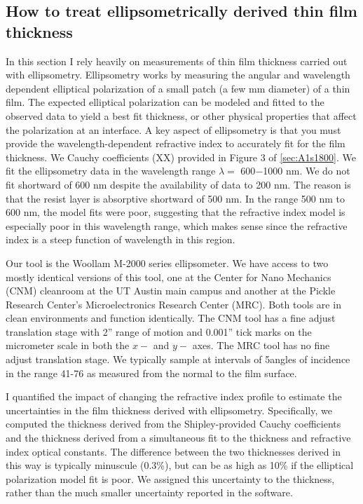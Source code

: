\subsection{How to treat ellipsometrically derived thin film thickness}
In this section I rely heavily on measurements of thin film thickness carried out with ellipsometry.  Ellipsometry works by measuring the angular and wavelength dependent elliptical polarization of a small patch (a few mm diameter) of a thin film.  The expected elliptical polarization can be modeled and fitted to the observed data to yield a best fit thickness, or other physical properties that affect the polarization at an interface.  A key aspect of ellipsometry is that you must provide the wavelength-dependent refractive index to accurately fit for the film thickness.  We Cauchy coefficients (XX) provided in Figure 3 of \ref{sec:A1s1800}.  We fit the ellipsometry data in the wavelength range $\lambda = $ 600$-$1000 nm.  We do not fit shortward of 600 nm despite the availability of data to 200 nm.  The reason is that the resist layer is absorptive shortward of 500 nm.  In the range 500 nm to 600 nm, the model fits were poor, suggesting that the refractive index model is especially poor in this wavelength range, which makes sense since the refractive index is a steep function of wavelength in this region.

Our tool is the Woollam M-2000 series ellipsometer.  We have access to two mostly identical versions of this tool, one at the Center for Nano Mechanics (CNM) cleanroom at the UT Austin main campus and another at the Pickle Research Center's Microelectronics Research Center (MRC).  Both tools are in clean environments and function identically.  The CNM tool has a fine adjust translation stage with 2'' range of motion and 0.001'' tick marks on the micrometer scale in both the $x-$ and $y-$ axes.  The MRC tool has no fine adjust translation stage.  We typically sample at intervals of 5\degree angles of incidence in the range 41-76 \degree as measured from the normal to the film surface.

I quantified the impact of changing the refractive index profile to estimate the uncertainties in the film thickness derived with ellipsometry.  Specifically, we computed the thickness derived from the Shipley-provided Cauchy coefficients and the thickness derived from a simultaneous fit to the thickness and refractive index optical constants.  The difference between the two thicknesses derived in this way is typically minuscule (0.3\%), but can be as high as 10\% if the elliptical polarization model fit is poor.  We assigned this uncertainty to the thickness, rather than the much smaller uncertainty reported in the software.  

